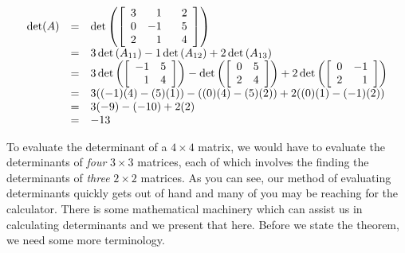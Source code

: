 \documentclass{ximera}
\begin{document}
\[ \begin{array}{rcl} 

\det(A) & = & \det \left( \left[ \begin{array}{rrr} 3 & 1 & \hphantom{-}2 \\ 0 & -1 & 5 \\ 2 & 1 & 4 \\ \end{array} \right] \right)\\ 
        & = & 3\det\left(A_{11}\right) - 1\det\left(A_{12}\right) + 2\det\left(A_{13}\right) \\ 
        & = & 3\det \left( \left[ \begin{array}{rr} -1 & 5 \\ 1 & 4 \\ \end{array} \right] \right) - \det \left( \left[ \begin{array}{rr} 0 & 5 \\ 2 & 4 \\ \end{array} \right] \right) + 2 \det \left( \left[ \begin{array}{rr} 0 & -1 \\ 2 & 1 \\ \end{array} \right] \right) \\ 
        & = & 3((-1)(4) - (5)(1)) - ((0)(4)-(5)(2))+2((0)(1)-(-1)(2)) \\
        & = & 3(-9)-(-10)+2(2) \\
        & = & -13 \\ \end{array}  \]

To evaluate the determinant of a $4 \times 4$ matrix, we would have to evaluate the determinants of \textit{four} $3 \times 3$ matrices, each of which involves the finding the determinants of \textit{three} $2 \times 2$ matrices. As you can see, our method of evaluating determinants quickly gets out of hand and many of you may be reaching for the calculator.  There is some mathematical machinery which can assist us in calculating determinants and we present that here.  Before we state the theorem, we need some more terminology.

 

\end{document}
